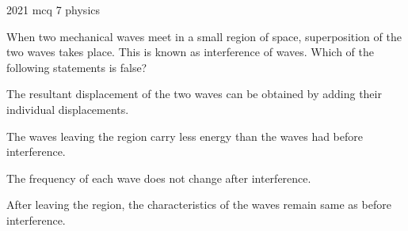 \ylDisplay
{}%
{2021}%
{mcq}%
{7}%
{physics}%
{}%
{
\ifStatement
When two mechanical waves meet in a small region of space, superposition of the two waves takes place. This is known as interference of waves. Which of the following statements is false?
\fi


The resultant displacement of the two waves can be obtained by adding their individual displacements.
\fi


The waves leaving the region carry less energy than the waves had before interference.
\fi


The frequency of each wave does not change after interference.
\fi


After leaving the region, the characteristics of the waves remain same as before interference.
\fi


\ifHint

\fi


\ifSolution

\fi


\ifEstStatement

\fi



\fi



\fi



\fi



\fi


\ifEstHint

\fi


\ifEstSolution

\fi
}
